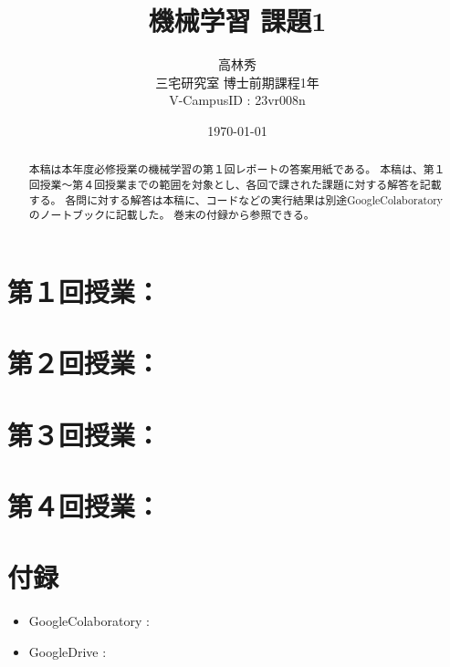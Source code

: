\documentclass{article}[jsarticle]
\title{機械学習 課題1}
\author{高林秀 \\ 三宅研究室 博士前期課程1年 \\ V-CampusID : 23vr008n}
\date{\today}
\begin{document}
\maketitle

\begin{abstract}
    本稿は本年度必修授業の機械学習の第１回レポートの答案用紙である。
    本稿は、第１回授業～第４回授業までの範囲を対象とし、各回で課された課題に対する解答を記載する。
    各問に対する解答は本稿に、コードなどの実行結果は別途GoogleColaboratoryのノートブックに記載した。
    巻末の付録から参照できる。
\end{abstract}

\section{第１回授業：}
\section{第２回授業：}
\section{第３回授業：}
\section{第４回授業：}

\section{付録}
\begin{itemize}
    \item GoogleColaboratory : 
    \item GoogleDrive : 
\end{itemize}
\end{document}
